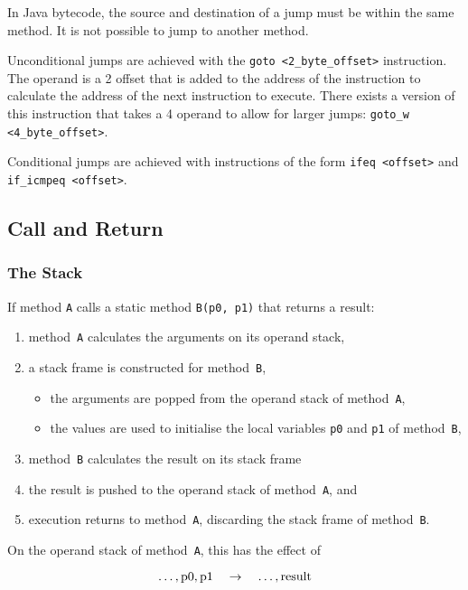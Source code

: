 In Java bytecode, the source and destination of a jump must be within the same method.
It is not possible to jump to another method.

Unconditional jumps are achieved with the \texttt{goto <2\_byte\_offset>} instruction.
The operand is a \SI{2}{\byte} offset that is added to the address of the instruction to calculate the address of the next instruction to execute.
There exists a version of this instruction that takes a \SI{4}{\byte} operand to allow for larger jumps: \texttt{goto\_w <4\_byte\_offset>}.

Conditional jumps are achieved with instructions of the form \texttt{ifeq <offset>} and \texttt{if\_icmpeq <offset>}.

\subsection{Call and Return}

\subsubsection{The Stack}

If method \texttt{A} calls a static method \texttt{B(p0, p1)} that returns a result:
\begin{enumerate}
  \item method~\texttt{A} calculates the arguments on its operand stack,
  \item a stack frame is constructed for method~\texttt{B},
  \begin{itemize}
    \item the arguments are popped from the operand stack of method~\texttt{A},
    \item the values are used to initialise the local variables \texttt{p0} and \texttt{p1} of method~\texttt{B},
  \end{itemize}
  \item method~\texttt{B} calculates the result on its stack frame
  \item the result is pushed to the operand stack of method~\texttt{A}, and
  \item execution returns to method~\texttt{A}, discarding the stack frame of method~\texttt{B}.
\end{enumerate}

On the operand stack of method~\texttt{A}, this has the effect of

\begin{equation*}
  \ldots, \textnormal{p0}, \textnormal{p1} \quad \rightarrow \quad \ldots, \textnormal{result}
\end{equation*}

